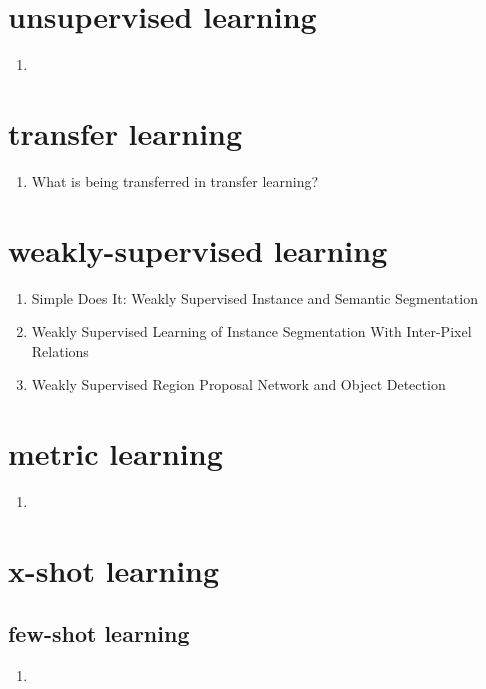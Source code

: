 \documentclass[acmlarge]{acmart}
\begin{document}
\section{unsupervised learning}
\begin{enumerate}
	\item
\end{enumerate}
\section{transfer learning}
\begin{enumerate}
	\item What is being transferred in transfer learning? \cite{Neyshabur2020WhatIB} 

\end{enumerate}
\section{weakly-supervised learning}
\begin{enumerate}
	\item Simple Does It: Weakly Supervised Instance and Semantic Segmentation \cite{Khoreva2017SimpleDI} 

	\item Weakly Supervised Learning of Instance Segmentation With Inter-Pixel Relations \cite{Ahn2019WeaklySL} 

	\item Weakly Supervised Region Proposal Network and Object Detection \cite{Tang2018WeaklySR} 

\end{enumerate}
\section{metric learning}
\begin{enumerate}
	\item
\end{enumerate}
\section{x-shot learning}
	\subsection{few-shot learning}
	\begin{enumerate}
		\item
	\end{enumerate}
\end{document}
